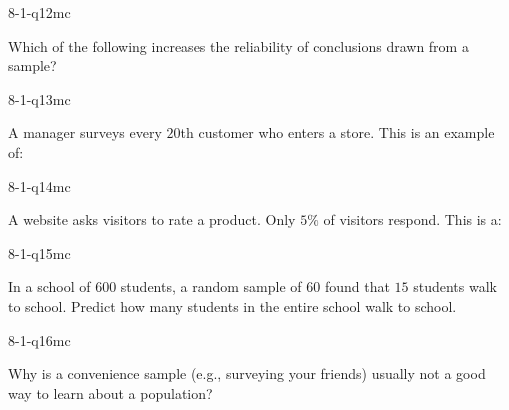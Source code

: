 \begin{practiceQuestion}{8-1-q12}{mc}
\begin{questionText}
Which of the following increases the reliability of conclusions drawn from a sample?
\end{questionText}
\end{practiceQuestion}

\begin{practiceQuestion}{8-1-q13}{mc}
\begin{questionText}
A manager surveys every $20$th customer who enters a store. This is an example of:
\end{questionText}
\end{practiceQuestion}

\begin{practiceQuestion}{8-1-q14}{mc}
\begin{questionText}
A website asks visitors to rate a product. Only $5\%$ of visitors respond. This is a:
\end{questionText}
\end{practiceQuestion}

\begin{practiceQuestion}{8-1-q15}{mc}
\begin{questionText}
In a school of $600$ students, a random sample of $60$ found that $15$ students walk to school. Predict how many students in the entire school walk to school.
\end{questionText}
\end{practiceQuestion}

\begin{practiceQuestion}{8-1-q16}{mc}
\begin{questionText}
Why is a convenience sample (e.g., surveying your friends) usually not a good way to learn about a population?
\end{questionText}
\end{practiceQuestion}

